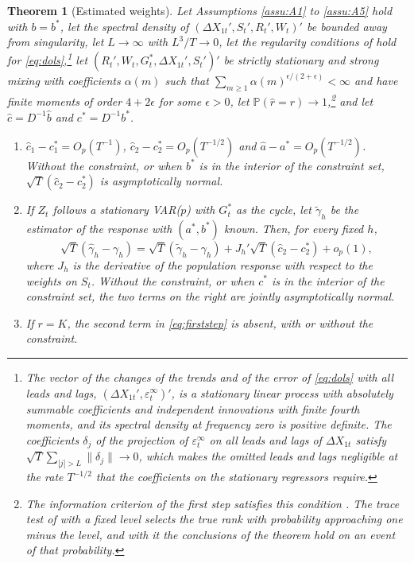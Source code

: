 \documentclass[12pt,a4paper]{article}
\newtheorem{thm}{Theorem}
\theoremstyle{definition}
\theoremstyle{definition}\newtheorem{example}{Example}
\theoremstyle{definition}\newtheorem{definition}{Definition}
\begin{document}
\begin{thm}[Estimated weights\label{thm:est}]
Let Assumptions \ref{assu:A1} to \ref{assu:A5} hold with $b=b^\ast$, let the spectral density of $(\Delta X_{1t}',S_t',R_t',W_t)'$ be bounded away from singularity, let $L\to\infty$ with $L^3/T\to0$, let the regularity conditions of \citet{Saikkonen1991} hold for \eqref{eq:dols},\footnote{The vector of the changes of the trends and of the error of \eqref{eq:dols} with all leads and lags, $(\Delta X_{1t}',\varepsilon^\infty_t)'$, is a stationary linear process with absolutely summable coefficients and independent innovations with finite fourth moments, and its spectral density at frequency zero is positive definite. The coefficients $\delta_j$ of the projection of $\varepsilon^\infty_t$ on all leads and lags of $\Delta X_{1t}$ satisfy $\sqrt{T}\sum_{|j|>L}\|\delta_j\|\to0$, which makes the omitted leads and lags negligible at the rate $T^{-1/2}$ that the coefficients on the stationary regressors require.} let $(R_t',W_t,G^\ast_t,\Delta X_{1t}',S_t')'$ be strictly stationary and strong mixing with coefficients $\alpha(m)$ such that $\sum_{m\geq1}\alpha(m)^{\epsilon/(2+\epsilon)}<\infty$ and have finite moments of order $4+2\epsilon$ for some $\epsilon>0$, let $\mathbb{P}(\hat r=r)\to1$,\footnote{The information criterion of the first step satisfies this condition \citep{AznarSalvador2002,ChengPhillips2009}. The trace test of \citet{Johansen1991} with a fixed level selects the true rank with probability approaching one minus the level, and with it the conclusions of the theorem hold on an event of that probability.} and let $\hat c=D^{-1}\hat b$ and $c^\ast=D^{-1}b^\ast$.
\begin{enumerate}
\item[(a)] $\hat c_1-c_1^\ast=O_p(T^{-1})$, $\hat c_2-c_2^\ast=O_p(T^{-1/2})$ and $\hat a-a^\ast=O_p(T^{-1/2})$. Without the constraint, or when $b^\ast$ is in the interior of the constraint set, $\sqrt{T}(\hat c_2-c_2^\ast)$ is asymptotically normal.
\item[(b)] If $Z_t$ follows a stationary VAR($p$) with $G^\ast_t$ as the cycle, let $\tilde\gamma_h$ be the estimator of the response with $(a^\ast,b^\ast)$ known. Then, for every fixed $h$,
\begin{equation}
\sqrt{T}(\hat\gamma_h-\gamma_h)=\sqrt{T}(\tilde\gamma_h-\gamma_h)+J_h'\sqrt{T}(\hat c_2-c_2^\ast)+o_p(1),
\label{eq:firststep}
\end{equation}
where $J_h$ is the derivative of the population response with respect to the weights on $S_t$. Without the constraint, or when $c^\ast$ is in the interior of the constraint set, the two terms on the right are jointly asymptotically normal.
\item[(c)] If $r=K$, the second term in \eqref{eq:firststep} is absent, with or without the constraint.
\end{enumerate}
\end{thm}
\end{document}
